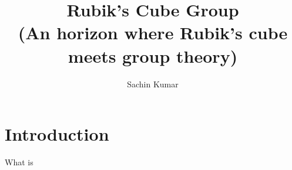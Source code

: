 \documentclass{article}
\title{Rubik's Cube Group \\ (An horizon where Rubik's cube meets group theory)}
\author{Sachin Kumar}
\begin{document}
\maketitle

\section*{Introduction}

What is
\end{document}
